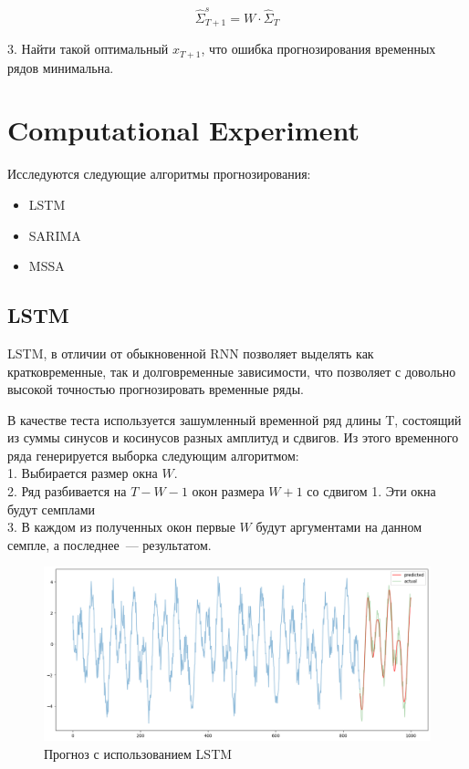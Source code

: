 \documentclass{article}
\begin{document}
\begin{equation}
	\hat{\Sigma}_{T+1}^s = W \cdot \hat{\Sigma}_{T}
\end{equation}


3. Найти такой оптимальный $x_{T+1}$, что ошибка прогнозирования временных рядов минимальна.

\section{Computational Experiment}

Исследуются следующие алгоритмы прогнозирования:

\begin{itemize}
	\item LSTM \cite{LSTM}
	\item SARIMA \cite{ARIMAvsLSTM}
	\item MSSA \cite{SSA}
\end{itemize}

\subsection{LSTM}

LSTM, в отличии от обыкновенной RNN позволяет выделять как кратковременные, так и долговременные зависимости, что позволяет с довольно высокой точностью прогнозировать временные ряды.

В качестве теста используется зашумленный временной ряд длины T, состоящий из суммы синусов и косинусов разных амплитуд и сдвигов. Из этого временного ряда генерируется выборка следующим алгоритмом:\\
1. Выбирается размер окна $W$.\\
2. Ряд разбивается на $T-W-1$ окон размера $W+1$ со сдвигом 1. Эти окна будут семплами\\
3. В каждом из полученных окон первые $W$ будут аргументами на данном семпле, а последнее~--- результатом.

\begin{figure}
	\centering
	\includegraphics[width=\textwidth]{LSTM-prediction.png}
	\caption{Прогноз с использованием LSTM}
	\label{fig:fig1}
\end{figure}
\end{document}
